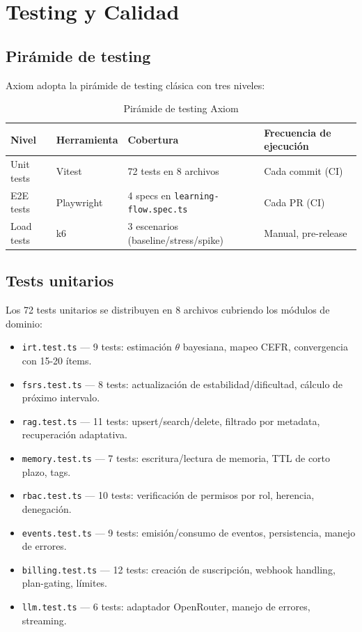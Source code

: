 \documentclass[10pt,a4paper,oneside]{report}
\begin{document}
\chapter{Testing y Calidad}

\section{Pirámide de testing}
Axiom adopta la pirámide de testing clásica con tres niveles:

\begin{table}[H]
\centering
\begin{tabular}{p{2.5cm}p{3cm}p{3.5cm}p{3cm}}
\toprule
\textbf{Nivel} & \textbf{Herramienta} & \textbf{Cobertura} & \textbf{Frecuencia de ejecución} \\
\midrule
Unit tests & Vitest & 72 tests en 8 archivos & Cada commit (CI) \\
E2E tests & Playwright & 4 specs en \texttt{learning-flow.spec.ts} & Cada PR (CI) \\
Load tests & k6 & 3 escenarios (baseline/stress/spike) & Manual, pre-release \\
\bottomrule
\end{tabular}
\caption{Pirámide de testing Axiom}
\end{table}

\section{Tests unitarios}
Los 72 tests unitarios se distribuyen en 8 archivos cubriendo los módulos de dominio:

\begin{itemize}[leftmargin=1.4em]
\item \texttt{irt.test.ts} — 9 tests: estimación $\theta$ bayesiana, mapeo CEFR, convergencia con 15-20 ítems.
\item \texttt{fsrs.test.ts} — 8 tests: actualización de estabilidad/dificultad, cálculo de próximo intervalo.
\item \texttt{rag.test.ts} — 11 tests: upsert/search/delete, filtrado por metadata, recuperación adaptativa.
\item \texttt{memory.test.ts} — 7 tests: escritura/lectura de memoria, TTL de corto plazo, tags.
\item \texttt{rbac.test.ts} — 10 tests: verificación de permisos por rol, herencia, denegación.
\item \texttt{events.test.ts} — 9 tests: emisión/consumo de eventos, persistencia, manejo de errores.
\item \texttt{billing.test.ts} — 12 tests: creación de suscripción, webhook handling, plan-gating, límites.
\item \texttt{llm.test.ts} — 6 tests: adaptador OpenRouter, manejo de errores, streaming.
\end{itemize}
\end{document}

